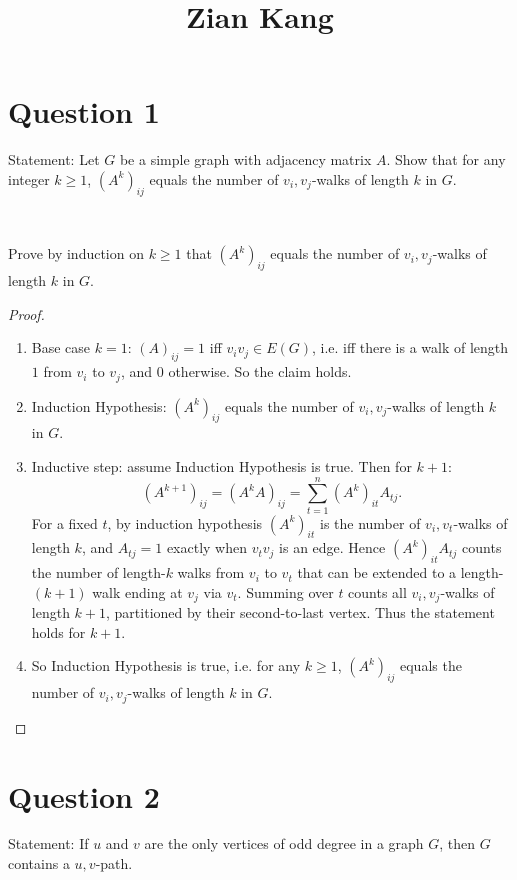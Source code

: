 \documentclass[11pt]{article}
\title{\vspace{-2cm} Zian Kang}
\date{}
\begin{document}
\maketitle

\section*{Question 1}
Statement: Let $G$ be a simple graph with adjacency matrix $A$. Show that for any integer $k \ge 1$,
$(A^k)_{ij}$ equals the number of $v_i, v_j$-walks of length $k$ in $G$.

~

Prove by induction on $k\ge 1$ that $(A^k)_{ij}$ equals the number of $v_i,v_j$-walks
of length $k$ in $G$.

\begin{proof}
    \begin{enumerate}
\item Base case $k=1$: $(A)_{ij}=1$ iff $v_iv_j\in E(G)$, i.e. iff there is a walk of length $1$
from $v_i$ to $v_j$, and $0$ otherwise. So the claim holds.

\item Induction Hypothesis: $(A^k)_{ij}$ equals the number of $v_i,v_j$-walks of length $k$ in $G$.

\item Inductive step: assume Induction Hypothesis is true. Then for $k+1$:
\[
(A^{k+1})_{ij}=(A^kA)_{ij}=\sum_{t=1}^n (A^k)_{it}A_{tj}.
\]
For a fixed $t$, by induction hypothesis $(A^k)_{it}$ is the number of $v_i,v_t$-walks of length $k$,
and $A_{tj}=1$ exactly when $v_tv_j$ is an edge.
Hence $(A^k)_{it}A_{tj}$ counts the number of length-$k$ walks from $v_i$ to $v_t$ that can be extended
to a length-$(k+1)$ walk ending at $v_j$ via $v_t$. Summing over $t$ counts all $v_i,v_j$-walks
of length $k+1$, partitioned by their second-to-last vertex. Thus the statement holds for $k+1$.

\item So Induction Hypothesis is true, i.e. for any $k\ge1$, $(A^k)_{ij}$ equals the number of $v_i,v_j$-walks of length $k$ in $G$.

\end{enumerate}
\end{proof}

\newpage

\section*{Question 2}
Statement: If $u$ and $v$ are the only vertices of odd degree in a graph $G$, then $G$ contains a $u,v$-path.
\end{document}

